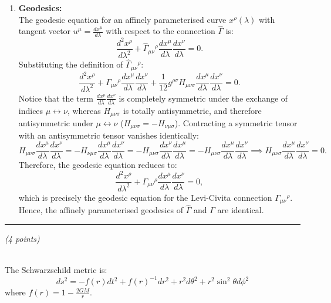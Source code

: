 \documentclass[12pt]{article}
\newcommand{\be}{\begin{equation}}
\newcommand{\ee}{\end{equation}}
\newcounter{quesno}
\newcommand{\ques}[1]{\vspace{2em}\stepcounter{quesno}
\noindent{\bf Question \thequesno.} \emph{(#1 points)\\}
}
\begin{document}
\begin{enumerate}[label=\alph*)]
\item \textbf{Geodesics:}\\
The geodesic equation for an affinely parameterised curve $x^\rho(\lambda)$ with tangent vector $u^\mu = \frac{dx^\mu}{d\lambda}$ with respect to the connection $\hat{\Gamma}$ is:
\begin{equation}
\frac{d^2 x^\rho}{d\lambda^2} + \hat{\Gamma}_{\mu\nu}{}^\rho \frac{dx^\mu}{d\lambda} \frac{dx^\nu}{d\lambda} = 0.
\end{equation}
Substituting the definition of $\hat{\Gamma}_{\mu\nu}{}^\rho$:
\begin{equation}
\frac{d^2 x^\rho}{d\lambda^2} + \Gamma_{\mu\nu}{}^\rho \frac{dx^\mu}{d\lambda} \frac{dx^\nu}{d\lambda} + \frac{1}{12} g^{\rho\sigma} H_{\mu\nu\sigma} \frac{dx^\mu}{d\lambda} \frac{dx^\nu}{d\lambda} = 0.
\end{equation}
Notice that the term $\frac{dx^\mu}{d\lambda} \frac{dx^\nu}{d\lambda}$ is completely symmetric under the exchange of indices $\mu \leftrightarrow \nu$, whereas $H_{\mu\nu\sigma}$ is totally antisymmetric, and therefore antisymmetric under $\mu \leftrightarrow \nu$ ($H_{\mu\nu\sigma} = -H_{\nu\mu\sigma}$). 
Contracting a symmetric tensor with an antisymmetric tensor vanishes identically:
\begin{equation}
H_{\mu\nu\sigma} \frac{dx^\mu}{d\lambda} \frac{dx^\nu}{d\lambda} = - H_{\nu\mu\sigma} \frac{dx^\mu}{d\lambda} \frac{dx^\nu}{d\lambda} = - H_{\mu\nu\sigma} \frac{dx^\nu}{d\lambda} \frac{dx^\mu}{d\lambda} = - H_{\mu\nu\sigma} \frac{dx^\mu}{d\lambda} \frac{dx^\nu}{d\lambda} \implies H_{\mu\nu\sigma} \frac{dx^\mu}{d\lambda} \frac{dx^\nu}{d\lambda} = 0.
\end{equation}
Therefore, the geodesic equation reduces to:
\begin{equation}
\frac{d^2 x^\rho}{d\lambda^2} + \Gamma_{\mu\nu}{}^\rho \frac{dx^\mu}{d\lambda} \frac{dx^\nu}{d\lambda} = 0,
\end{equation}
which is precisely the geodesic equation for the Levi-Civita connection $\Gamma_{\mu\nu}{}^\rho$. Hence, the affinely parameterised geodesics of $\hat{\Gamma}$ and $\Gamma$ are identical.
\end{enumerate}

\vspace{1.5em}
\hrule

\ques{4}
\\
The Schwarzschild metric is:
\be
ds^2 = - f(r) dt^2 + f(r)^{-1} dr^2 + r^2 d \theta^2 + r^2 \sin^2 \theta d\phi^2 
\ee
where $f(r) = 1 - \frac{2GM}{r}$. 
\end{document}
